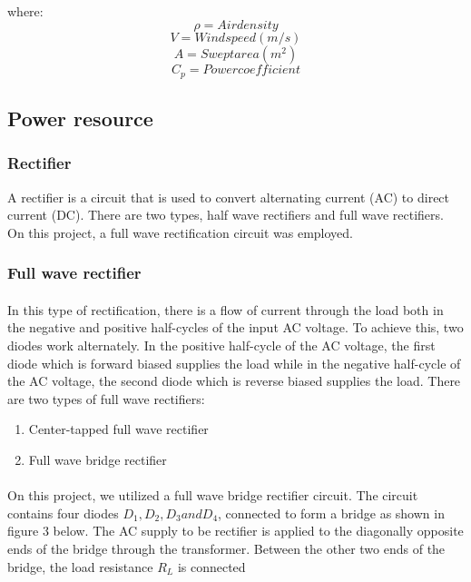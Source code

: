 \documentclass[titlepage]{article}
\begin{document}
    \paragraph{}where:
         $$ \rho = Air density $$
        $$V = Wind speed (m/s)$$
         $$ A = Swept area (m^2)$$
        $$ C_{p} = Power coefficient $$
    

\subsection{Power resource}
\subsubsection{Rectifier}

A rectifier is a circuit that is used to convert alternating current (AC) to direct current (DC). There are two types, half wave rectifiers and full wave rectifiers. On this project, a full wave rectification circuit was employed.


\subsubsection{Full wave rectifier}

\paragraph{}In this type of rectification, there is a flow of current through the load both in the negative and positive half-cycles of the input AC voltage. To achieve this, two diodes work alternately. In the positive half-cycle of the AC voltage, the first diode which is forward biased supplies the load while in the negative half-cycle of the AC voltage, the second diode which is reverse biased supplies the load. There are two types of full wave rectifiers:
\begin{enumerate}
  \item Center-tapped full wave rectifier
  \item Full wave bridge rectifier
 \end{enumerate} 
  
\paragraph{ } On this project, we utilized a full wave bridge rectifier circuit. The circuit contains four diodes $ D_{1}, D_{2}, D_{3} and D_{4} $, connected to form a bridge as shown in figure 3 below. The AC supply to be rectifier is applied to the diagonally opposite ends of the bridge through the transformer. Between the other two ends of the bridge, the load resistance $ R_{L} $ is connected ~\cite{MEHTA}
\end{document}
